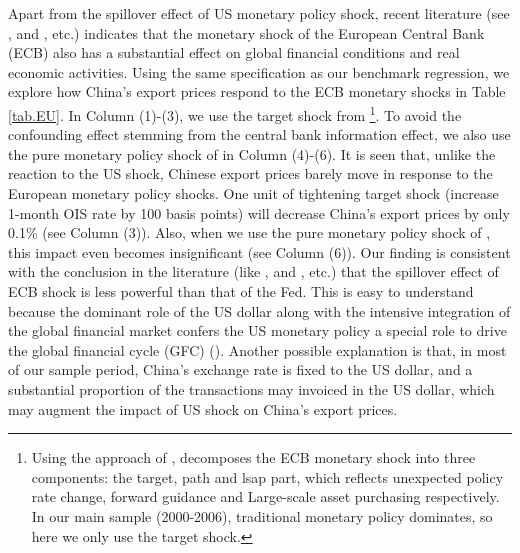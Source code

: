 Apart from the spillover effect of US monetary policy shock, recent literature (see \cite{ca2020monetary}, \cite{corsetti2021exchange} and \cite{miranda2022tale}, etc.) indicates that the monetary shock of the European Central Bank (ECB) also has a substantial effect on global financial conditions and real economic activities. Using the same specification as our benchmark regression, we explore how China's export prices respond to the ECB monetary shocks in Table \ref{tab.EU}. In Column (1)-(3), we use the target shock from \cite{miranda2022tale} \footnote{Using the approach of \cite{swanson2021measuring}, \cite{miranda2022tale} decomposes the ECB monetary shock into three components: the target, path and lsap part, which reflects unexpected policy rate change, forward guidance and Large-scale asset purchasing respectively. In our main sample (2000-2006), traditional monetary policy dominates, so here we only use the target shock.}. To avoid the confounding effect stemming from the central bank information effect, we also use the pure monetary policy shock of \cite{jarocinski2020deconstructing} in Column (4)-(6). It is seen that, unlike the reaction to the US shock, Chinese export prices barely move in response to the European monetary policy shocks. One unit of tightening target shock (increase 1-month OIS rate by 100 basis points) will decrease China's export prices by only 0.1$\%$ (see Column (3)). Also, when we use the pure monetary policy shock of \cite{jarocinski2020deconstructing}, this impact even becomes insignificant (see Column (6)). Our finding is consistent with the conclusion in the literature (like \cite{ca2020monetary}, \cite{corsetti2021exchange} and \cite{miranda2022tale}, etc.) that the spillover effect of ECB shock is less powerful than that of the Fed. This is easy to understand because the dominant role of the US dollar along with the intensive integration of the global financial market confers the US monetary policy a special role to drive the global financial cycle (GFC) (\cite{miranda2020us}). Another possible explanation is that, in most of our sample period, China's exchange rate is fixed to the US dollar, and a substantial proportion of the transactions may invoiced in the US dollar, which may augment the impact of US shock on China's export prices. 

